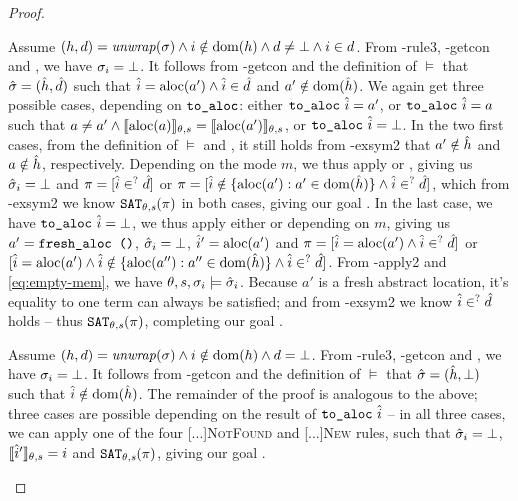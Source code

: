 \begin{proof}
\begin{hypvlist}
 Assume $(h,d)={\operatorname{\mathit{unwrap}}}(\sigma) \land i\notin\operatorname{dom}(h) \land d\neq\bot \land i\in d$.
 From \hyp{rule3}, \hyp{getcon} and , we have $\sigma_i=\bot$.
 It follows from \hyp{getcon} and the definition of $\models$ that $\hat{\sigma}=(\hat{h}, \hat{d})$ such that $\hat{i}=\text{aloc}(a') \land \hat{i} \in \hat{d}$ and $a'\notin \operatorname{dom}(\hat{h})$.
 We again get three possible cases, depending on $\texttt{to\_aloc}$: either $\texttt{to\_aloc}~\hat{i}=a'$, or $\texttt{to\_aloc}~\hat{i}=a$ such that $a\neq a'\land \llbracket\text{aloc}(a)\rrbracket_{\theta,s}=\llbracket\text{aloc}(a')\rrbracket_{\theta,s}$, or $\texttt{to\_aloc}~\hat{i}=\bot$.
 In the two first cases, from the definition of $\models$ and , it still holds from \hyp{exsym2} that $a'\notin \hat{h}$ and $a\notin \hat{h}$, respectively. Depending on the mode $m$, we thus apply  or , giving us $\hat{\sigma}_i=\bot$ and $\pi=[\hat{i}\in^? \hat{d}]$ or $\pi=[\hat{i} \notin \{\text{aloc}(a'):a'\in \operatorname{dom}(\hat{h})\} \land \hat{i}\in^? \hat{d}]$, which from \hyp{exsym2} we know $\texttt{SAT}_{\mathit{\theta,s}}(\pi)$ in both cases, giving our goal .
 In the last case, we have $\texttt{to\_aloc}~\hat{i}=\bot$, we thus apply either  or  depending on $m$, giving us $a'=\texttt{fresh\_aloc ()}$, $\hat{\sigma}_i=\bot$, $\hat{i}'=\text{aloc}(a')$ and $\pi=[\hat{i}=\text{aloc}(a') \land \hat{i}\in^? \hat{d}]$ or $[\hat{i}=\text{aloc}(a') \land \hat{i}\notin\{\text{aloc}(a''):a''\in \operatorname{dom}(\hat{h})\} \land \hat{i} \in^? \hat{d}]$. From \hyp{apply2} and \ref{eq:empty-mem}, we have $\theta,s,\sigma_i\models\hat{\sigma}_i$. Because $a'$ is a fresh abstract location, it's equality to one term can always be satisfied; and from \hyp{exsym2} we know $\hat{i}\in^?\hat{d}$ holds -- thus $\texttt{SAT}_{\mathit{\theta,s}}(\pi)$, completing our goal .
\end{hypvlist}


\begin{hypvlist}
 Assume $(h,d)={\operatorname{\mathit{unwrap}}}(\sigma) \land i\notin\operatorname{dom}(h) \land d=\bot$.
 From \hyp{rule3}, \hyp{getcon} and , we have $\sigma_i=\bot$.
 It follows from \hyp{getcon} and the definition of $\models$ that $\hat{\sigma}=(\hat{h}, \bot)$ such that $\hat{i}\notin \operatorname{dom}(\hat{h})$.
 The remainder of the proof is analogous to the above; three cases are possible depending on the result of $\texttt{to\_aloc}~\hat{i}$ -- in all three cases, we can apply one of the four \textsc{[...]NotFound} and \textsc{[...]New} rules, such that $\hat{\sigma}_i=\bot$, $\llbracket\hat{i}'\rrbracket_{\theta,s}=i$ and $\texttt{SAT}_{\mathit{\theta,s}}(\pi)$, giving our goal .
\end{hypvlist}


\end{proof}
